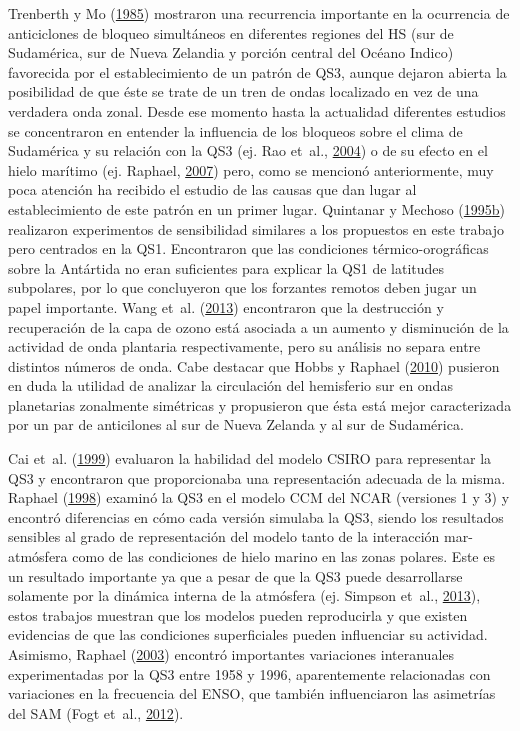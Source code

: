 \documentclass[spanish,a4paper,12pt,oneside]{book}
\begin{document}
Trenberth y Mo (\protect\hyperlink{ref-Trenberth1985}{1985}) mostraron
una recurrencia importante en la ocurrencia de anticiclones de bloqueo
simultáneos en diferentes regiones del HS (sur de Sudamérica, sur de
Nueva Zelandia y porción central del Océano Indico) favorecida por el
establecimiento de un patrón de QS3, aunque dejaron abierta la
posibilidad de que éste se trate de un tren de ondas localizado en vez
de una verdadera onda zonal. Desde ese momento hasta la actualidad
diferentes estudios se concentraron en entender la influencia de los
bloqueos sobre el clima de Sudamérica y su relación con la QS3 (ej. Rao
et~al., \protect\hyperlink{ref-Rao2004}{2004}) o de su efecto en el
hielo marítimo (ej. Raphael, \protect\hyperlink{ref-Raphael2007}{2007})
pero, como se mencionó anteriormente, muy poca atención ha recibido el
estudio de las causas que dan lugar al establecimiento de este patrón en
un primer lugar. Quintanar y Mechoso
(\protect\hyperlink{ref-Quintanar1995}{1995}\protect\hyperlink{ref-Quintanar1995}{b})
realizaron experimentos de sensibilidad similares a los propuestos en
este trabajo pero centrados en la QS1. Encontraron que las condiciones
térmico-orográficas sobre la Antártida no eran suficientes para explicar
la QS1 de latitudes subpolares, por lo que concluyeron que los forzantes
remotos deben jugar un papel importante. Wang et~al.
(\protect\hyperlink{ref-Wang2013}{2013}) encontraron que la destrucción
y recuperación de la capa de ozono está asociada a un aumento y
disminución de la actividad de onda plantaria respectivamente, pero su
análisis no separa entre distintos números de onda. Cabe destacar que
Hobbs y Raphael (\protect\hyperlink{ref-Hobbs2010}{2010}) pusieron en
duda la utilidad de analizar la circulación del hemisferio sur en ondas
planetarias zonalmente simétricas y propusieron que ésta está mejor
caracterizada por un par de anticilones al sur de Nueva Zelanda y al sur
de Sudamérica.

Cai et~al. (\protect\hyperlink{ref-Cai1999}{1999}) evaluaron la
habilidad del modelo CSIRO para representar la QS3 y encontraron que
proporcionaba una representación adecuada de la misma. Raphael
(\protect\hyperlink{ref-Raphael1998}{1998}) examinó la QS3 en el modelo
CCM del NCAR (versiones 1 y 3) y encontró diferencias en cómo cada
versión simulaba la QS3, siendo los resultados sensibles al grado de
representación del modelo tanto de la interacción mar-atmósfera como de
las condiciones de hielo marino en las zonas polares. Este es un
resultado importante ya que a pesar de que la QS3 puede desarrollarse
solamente por la dinámica interna de la atmósfera (ej. Simpson et~al.,
\protect\hyperlink{ref-Simpson2013}{2013}), estos trabajos muestran que
los modelos pueden reproducirla y que existen evidencias de que las
condiciones superficiales pueden influenciar su actividad. Asimismo,
Raphael (\protect\hyperlink{ref-Raphael2003}{2003}) encontró importantes
variaciones interanuales experimentadas por la QS3 entre 1958 y 1996,
aparentemente relacionadas con variaciones en la frecuencia del ENSO,
que también influenciaron las asimetrías del SAM (Fogt et~al.,
\protect\hyperlink{ref-Fogt2012}{2012}).
\end{document}
